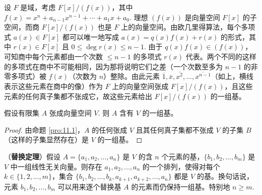 \begin{example}
设 \(F\) 是域，考虑 \(F[x]/(f(x))\)，其中 \(f(x) = x^n+a_{n-1}x^{n-1}+\cdots+a_1x+a_0\). 理想 \((f(x))\) 是向量空间 \(F[x]\) 的子空间，而商 \(F[x]/(f(x))\) 也是 \(F\) 上的向量空间。由欧几里得算法，每个多项式 \(a(x) \in F[x]\) 都可以唯一地写成 \(a(x) = q(x)f(x)+r(x)\) 的形式，其中 \(r(x) \in F[x]\) 且 \(0 \leq \deg r(x) \leq n-1\). 由于 \(q(x)f(x) \in (f(x))\)，可知商中每个元素都由一个次数 \(\leq n-1\) 的多项式 \(r(x)\) 代表。两个不同的这样的多项式在商中不可能相同，因为那将说明它们之差（一个次数至多为 \(n-1\) 的非零多项式）被 \(f(x)\)（次数为 \(n\)）整除。由此元素 \(\overline{1}, \overline{x}, \overline{x^2}, \ldots, \overline{x^{n-1}}\)（如上，横线表示这些元素在商中的像）作为 \(F\) 上的向量空间张成 \(F[x]/(f(x))\)，且这些元素的任何真子集都不张成它，故这些元素给出 \(F[x]/(f(x))\) 的一组基。
\end{example}

\begin{corollary}\label{cor:11.2}
假设有限集 \(A\) 张成向量空间 \(V\). 则 \(A\) 含有 \(V\) 的一组基。
\end{corollary}

\begin{proof}
由命题 \ref{pro:11.1}，\(A\) 的任何张成 \(V\) 且其任何真子集都不张成 \(V\) 的子集 \(B\)（这样的子集显然存在）是 \(V\) 的一组基。
\end{proof}

\begin{theorem}\label{thm:11.3}
（\textbf{替换定理}）假设 \(A = \{a_1, a_2, \ldots, a_n\}\) 是 \(V\) 的含 \(n\) 个元素的基，\(\{b_1, b_2, \ldots, b_m\}\) 是 \(V\) 中一组线性无关向量。则存在 \(a_1, a_2, \ldots, a_n\) 的一个排列，使得对每个 \(k \in \{1, 2, \ldots, m\}\)，集合 \(\{b_1, b_2, \ldots, b_k, a_{k+1}, a_{k+2}, \ldots, a_n\}\) 都是 \(V\) 的基。换句话说，元素 \(b_1, b_2, \ldots, b_m\) 可以用来逐个替换基 \(A\) 的元素而仍保持一组基。特别地 \(n \geq m\).
\end{theorem}

